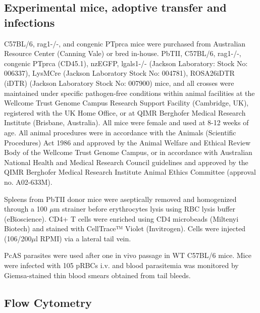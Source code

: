 \subsection{Experimental mice, adoptive transfer and infections}

\begin{sloppypar}
C57BL/6, rag1-/-, and congenic PTprca mice were purchased from Australian Resource Center (Canning Vale) or bred in-house. PbTII, C57BL/6, rag1-/-, congenic PTprca (CD45.1), nzEGFP, lgals1-/- (Jackson Laboratory: Stock No: 006337), LysMCre (Jackson Laboratory Stock No: 004781), ROSA26iDTR (iDTR) (Jackson Laboratory Stock No: 007900) mice, and all crosses were maintained under specific pathogen-free conditions within animal facilities at the Wellcome Trust Genome Campus Research Support Facility (Cambridge, UK), registered with the UK Home Office, or at QIMR Berghofer Medical Research Institute (Brisbane, Australia). All mice were female and used at 8-12 weeks of age. All animal procedures were in accordance with the Animals (Scientific Procedures) Act 1986 and approved by the Animal Welfare and Ethical Review Body of the Wellcome Trust Genome Campus, or in accordance with Australian National Health and Medical Research Council guidelines and approved by the QIMR Berghofer Medical Research Institute Animal Ethics Committee (approval no. A02-633M).
\end{sloppypar}

Spleens from PbTII donor mice were aseptically removed and homogenized through a 100 \( \mu \)m strainer before erythrocytes lysis using RBC lysis buffer (eBioscience). CD4+ T cells were enriched using CD4 microbeads (Miltenyi Biotech) and stained with CellTrace™ Violet (Invitrogen). Cells were injected (106/200\( \mu \)l RPMI) via a lateral tail vein.

PcAS parasites were used after one in vivo passage in WT C57BL/6 mice. Mice were infected with 105 pRBCs i.v. and blood parasitemia was monitored by Giemsa-stained thin blood smears obtained from tail bleeds.

\subsection{Flow Cytometry}

